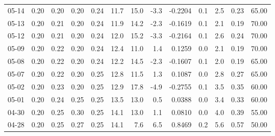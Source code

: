 \begin{threeparttable}
{\begin{tabular}{lrrrrrrrrrrrr}
  05-14 &          0.20 &          0.20 &          0.20 &        0.24 &                11.7 &                15.0 &       -3.3 &      -0.2204 &                 0.1 &              2.5 &            0.23 &                  65.00 \\
  05-13 &          0.20 &          0.21 &          0.20 &        0.24 &                11.9 &                14.2 &       -2.3 &      -0.1619 &                 0.1 &              2.1 &            0.19 &                  70.00 \\
  05-12 &          0.20 &          0.21 &          0.20 &        0.24 &                12.0 &                15.2 &       -3.3 &      -0.2164 &                 0.1 &              2.6 &            0.24 &                  70.00 \\
  05-09 &          0.20 &          0.22 &          0.20 &        0.24 &                12.4 &                11.0 &        1.4 &       0.1259 &                 0.0 &              2.1 &            0.19 &                  70.00 \\
  05-08 &          0.20 &          0.22 &          0.20 &        0.24 &                12.2 &                14.5 &       -2.3 &      -0.1607 &                 0.1 &              2.0 &            0.19 &                  65.00 \\
  05-07 &          0.20 &          0.22 &          0.20 &        0.25 &                12.8 &                11.5 &        1.3 &       0.1087 &                 0.0 &              2.8 &            0.27 &                  65.00 \\
  05-02 &          0.20 &          0.23 &          0.20 &        0.25 &                12.9 &                17.8 &       -4.9 &      -0.2755 &                 0.1 &              3.5 &            0.35 &                  60.00 \\
  05-01 &          0.20 &          0.24 &          0.25 &        0.25 &                13.5 &                13.0 &        0.5 &       0.0388 &                 0.0 &              3.4 &            0.33 &                  60.00 \\
  04-30 &          0.20 &          0.25 &          0.30 &        0.25 &                14.1 &                13.0 &        1.1 &       0.0810 &                 0.0 &              4.0 &            0.39 &                  55.00 \\
  04-28 &          0.20 &          0.25 &          0.27 &        0.25 &                14.1 &                 7.6 &        6.5 &       0.8469 &                 0.2 &              5.6 &            0.57 &                  50.00 \\

\end{tabular}}
\end{threeparttable}
